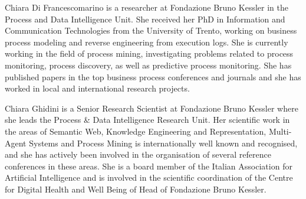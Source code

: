 \documentclass[10pt,journal,compsoc]{IEEEtran}
\theoremstyle{definition}
\theoremstyle{plain}
\begin{document}
\begin{IEEEbiography}{Chiara Di Francescomarino}
is a researcher at Fondazione Bruno Kessler in the Process and Data Intelligence  Unit.  She received her PhD in Information and Communication Technologies from the University of Trento, working on business process modeling and reverse engineering from execution logs. She is currently working in the field of process mining, investigating problems related to process monitoring, process discovery, as well as predictive process monitoring. She has published papers in the top business process conferences and journals and she has worked in local and international research projects. 
\end{IEEEbiography}

\begin{IEEEbiography}{Chiara Ghidini}
is a Senior Research Scientist at Fondazione Bruno Kessler where she leads the Process \& Data Intelligence Research Unit.  
Her scientific work in the areas of Semantic Web, Knowledge Engineering and Representation, Multi-Agent Systems and Process Mining is internationally well known and recognised, and she has actively been involved in the organisation of several reference conferences in these areas. She is a board member of the Italian Association for Artificial Intelligence and is involved in the scientific coordination of the Centre for Digital Health and Well Being of Head of Fondazione Bruno Kessler.
\end{IEEEbiography}
\end{document}

